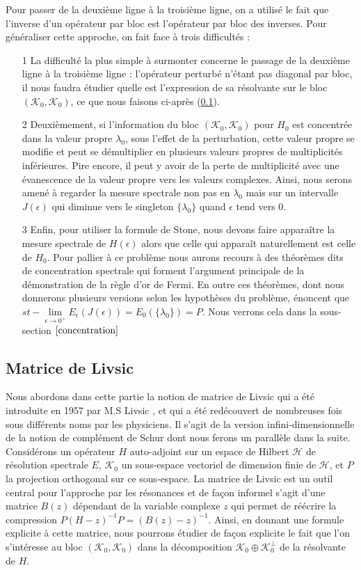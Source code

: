 \documentclass[12pt,openany,a4paper, titlepage]{article}
\newcommand{\HH}{\mathcal{H}}
\newcommand{\KK}{\mathcal{K}}
\newcommand{\inv}{^{-1}}
\newcommand{\limeo}{\lim\limits_{\epsilon \rightarrow 0^+}}
\theoremstyle{definition}
\theoremstyle{definition}
\theoremstyle{definition}
\theoremstyle{definition}
\theoremstyle{definition}
\theoremstyle{definition}
\begin{document}
Pour passer de la deuxième ligne à la troisième ligne, on a utilisé le fait que l'inverse d'un opérateur par bloc est l'opérateur par bloc des inverses. 
Pour généraliser cette approche, on fait face à trois difficultés :
\begin{enumerate}
    \item[1] La difficulté la plus simple à surmonter concerne le passage de la deuxième ligne à la troisième ligne : l'opérateur perturbé n'étant pas diagonal par bloc, il nous faudra étudier quelle est l'expression de sa résolvante sur le bloc $(\KK_0,\KK_0)$, ce que nous faisons ci-après (\ref{matrice_livsic}).
    \item[2] Deuxièmement, si l'information du bloc $(\KK_0,\KK_0)$ pour $H_0$ est concentrée dans la valeur propre $\lambda_0$, sous l'effet de la perturbation, cette valeur propre se modifie et peut se démultiplier en plusieurs valeurs propres de multiplicités inférieures. Pire encore, il peut y avoir de la perte de multiplicité avec une évanescence de la valeur propre vers les valeurs complexes. Ainsi, nous serons amené à regarder la mesure spectrale non pas en $\lambda_0$ mais sur un intervalle $J(\epsilon)$ qui diminue vers le singleton $\{\lambda_0\}$ quand $\epsilon$ tend vers $0$.
    \item[3] Enfin, pour utiliser la formule de Stone, nous devons faire apparaître la mesure spectrale de $H(\epsilon)$ alors que celle qui apparaît naturellement est celle de $H_0$. Pour pallier à ce problème nous aurons recours à des théorèmes dits de concentration spectrale qui forment l'argument principale de la démonstration de la règle d'or de Fermi. En outre ces théorèmes, dont nous donnerons plusieurs versions selon les hypothèses du problème, énoncent que $st-\limeo E_\epsilon(J(\epsilon)) = E_0(\{\lambda_0\}) = P$. Nous verrons cela dans la sous-section $\ref{concentration}$
\end{enumerate}

\subsection{Matrice de Livsic}\label{matrice_livsic}

Nous abordons dans cette partie la notion de matrice de Livsic qui a été introduite en 1957 par M.S Livsic \cite{HOWLAND1975415}, et qui a été redécouvert de nombreuses fois sous différents noms par les physiciens. Il s'agit de la version infini-dimensionnelle de la notion de complément de Schur dont nous ferons un parallèle dans la suite. Considérons un opérateur $H$ auto-adjoint sur un espace de Hilbert $\HH$ de résolution spectrale $E$, $\mathcal{K}_0$ un sous-espace vectoriel de dimension finie de $\HH$, et $P$ la projection orthogonal sur ce sous-espace. La matrice de Livsic est un outil central pour l'approche par les résonances et de façon informel s'agit d'une matrice $B(z)$ dépendant de la variable complexe $z$ qui permet de réécrire la compression $P(H-z)\inv P = (B(z) -z)\inv$. Ainsi, en donnant une formule explicite à cette matrice, nous pourrons étudier de façon explicite le fait que l'on s'intéresse au bloc $(\mathcal{K}_0,\mathcal{K}_0)$ dans la décomposition $\mathcal{K}_0\oplus \mathcal{K}_0^\perp$ de la résolvante de $H$.
\end{document}
